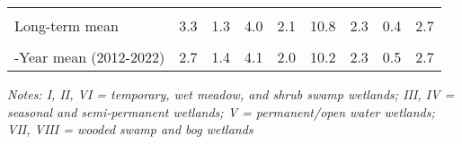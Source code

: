 \documentclass[
  12pt,
]{article}
\begin{document}
\begin{table}[!h]
{\begin{threeparttable}
\begin{tabular}[t]{>{\centering\arraybackslash}m{8em}cccccccc}
\cellcolor{gray!6}{\% Change from previous year} & \cellcolor{gray!6}{-94.9\%} & \cellcolor{gray!6}{-80.6\%} & \cellcolor{gray!6}{-71.2\%} & \cellcolor{gray!6}{-96.3\%} & \cellcolor{gray!6}{-84.1\%} & \cellcolor{gray!6}{-90.8\%} & \cellcolor{gray!6}{-97.0\%} & \cellcolor{gray!6}{-91.4\%}\\
Long-term mean & 3.3 & 1.3 & 4.0 & 2.1 & 10.8 & 2.3 & 0.4 & 2.7\\
\cellcolor{gray!6}{\% Change from long-term mean} & \cellcolor{gray!6}{-97.8\%} & \cellcolor{gray!6}{-83.8\%} & \cellcolor{gray!6}{-58.1\%} & \cellcolor{gray!6}{-90.8\%} & \cellcolor{gray!6}{-80.0\%} & \cellcolor{gray!6}{-86.8\%} & \cellcolor{gray!6}{-97.6\%} & \cellcolor{gray!6}{-88.5\%}\\
10-Year mean (2012-2022) & 2.7 & 1.4 & 4.1 & 2.0 & 10.2 & 2.3 & 0.5 & 2.7\\
\bottomrule
\end{tabular}
\begin{tablenotes}
\small
\item \textit{Notes: I, II, VI = temporary, wet meadow, and shrub swamp
    wetlands; III, IV = seasonal and semi-permanent wetlands; V =
    permanent/open water wetlands; VII, VIII = wooded swamp and bog wetlands} 
\item 
\end{tablenotes}
\end{threeparttable}}
\end{table}

\newpage
\end{document}
